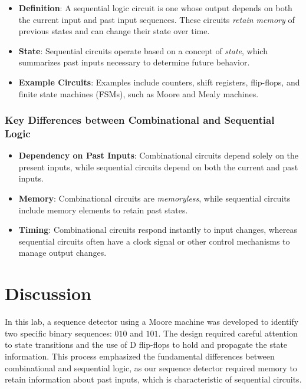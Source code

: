 \documentclass[12pt]{article}
\begin{document}
\begin{itemize}
	\item \textbf{Definition}: A sequential logic circuit is one whose output depends on both the current input and past input sequences. These circuits \textit{retain memory} of previous states and can change their state over time.
	\item \textbf{State}: Sequential circuits operate based on a concept of \textit{state}, which summarizes past inputs necessary to determine future behavior.
	\item \textbf{Example Circuits}: Examples include counters, shift registers, flip-flops, and finite state machines (FSMs), such as Moore and Mealy machines.
\end{itemize}

\hline

\subsubsection*{Key Differences between Combinational and Sequential Logic}
\begin{itemize}
	\item \textbf{Dependency on Past Inputs}: Combinational circuits depend solely on the present inputs, while sequential circuits depend on both the current and past inputs.
	\item \textbf{Memory}: Combinational circuits are \textit{memoryless}, while sequential circuits include memory elements to retain past states.
	\item \textbf{Timing}: Combinational circuits respond instantly to input changes, whereas sequential circuits often have a clock signal or other control mechanisms to manage output changes.
\end{itemize}
\vspace{.5mm}
\hline


\section*{Discussion}

\quad In this lab, a sequence detector using a Moore machine was developed to identify two specific binary sequences: \( 010 \) and \( 101 \). The design required careful attention to state transitions and the use of D flip-flops to hold and propagate the state information. This process emphasized the fundamental differences between combinational and sequential logic, as our sequence detector required memory to retain information about past inputs, which is characteristic of sequential circuits.
\end{document}
